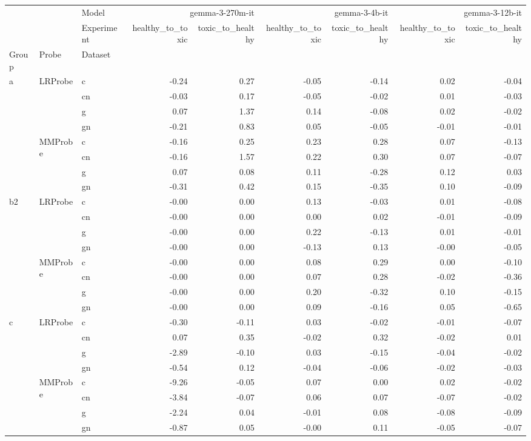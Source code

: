 \begin{tabular}{lllrrrrrr}
\toprule
 &  & Model & \multicolumn{2}{r}{gemma-3-270m-it} & \multicolumn{2}{r}{gemma-3-4b-it} & \multicolumn{2}{r}{gemma-3-12b-it} \\
 &  & Experiment & healthy_to_toxic & toxic_to_healthy & healthy_to_toxic & toxic_to_healthy & healthy_to_toxic & toxic_to_healthy \\
Group & Probe & Dataset &  &  &  &  &  &  \\
\midrule
\multirow[t]{8}{*}{a} & \multirow[t]{4}{*}{LRProbe} & c & -0.24 & 0.27 & -0.05 & -0.14 & 0.02 & -0.04 \\
 &  & cn & -0.03 & 0.17 & -0.05 & -0.02 & 0.01 & -0.03 \\
 &  & g & 0.07 & 1.37 & 0.14 & -0.08 & 0.02 & -0.02 \\
 &  & gn & -0.21 & 0.83 & 0.05 & -0.05 & -0.01 & -0.01 \\
\cline{2-9}
 & \multirow[t]{4}{*}{MMProbe} & c & -0.16 & 0.25 & 0.23 & 0.28 & 0.07 & -0.13 \\
 &  & cn & -0.16 & 1.57 & 0.22 & 0.30 & 0.07 & -0.07 \\
 &  & g & 0.07 & 0.08 & 0.11 & -0.28 & 0.12 & 0.03 \\
 &  & gn & -0.31 & 0.42 & 0.15 & -0.35 & 0.10 & -0.09 \\
\cline{1-9} \cline{2-9}
\multirow[t]{8}{*}{b2} & \multirow[t]{4}{*}{LRProbe} & c & -0.00 & 0.00 & 0.13 & -0.03 & 0.01 & -0.08 \\
 &  & cn & -0.00 & 0.00 & 0.00 & 0.02 & -0.01 & -0.09 \\
 &  & g & -0.00 & 0.00 & 0.22 & -0.13 & 0.01 & -0.01 \\
 &  & gn & -0.00 & 0.00 & -0.13 & 0.13 & -0.00 & -0.05 \\
\cline{2-9}
 & \multirow[t]{4}{*}{MMProbe} & c & -0.00 & 0.00 & 0.08 & 0.29 & 0.00 & -0.10 \\
 &  & cn & -0.00 & 0.00 & 0.07 & 0.28 & -0.02 & -0.36 \\
 &  & g & -0.00 & 0.00 & 0.20 & -0.32 & 0.10 & -0.15 \\
 &  & gn & -0.00 & 0.00 & 0.09 & -0.16 & 0.05 & -0.65 \\
\cline{1-9} \cline{2-9}
\multirow[t]{8}{*}{c} & \multirow[t]{4}{*}{LRProbe} & c & -0.30 & -0.11 & 0.03 & -0.02 & -0.01 & -0.07 \\
 &  & cn & 0.07 & 0.35 & -0.02 & 0.32 & -0.02 & 0.01 \\
 &  & g & -2.89 & -0.10 & 0.03 & -0.15 & -0.04 & -0.02 \\
 &  & gn & -0.54 & 0.12 & -0.04 & -0.06 & -0.02 & -0.03 \\
\cline{2-9}
 & \multirow[t]{4}{*}{MMProbe} & c & -9.26 & -0.05 & 0.07 & 0.00 & 0.02 & -0.02 \\
 &  & cn & -3.84 & -0.07 & 0.06 & 0.07 & -0.07 & -0.02 \\
 &  & g & -2.24 & 0.04 & -0.01 & 0.08 & -0.08 & -0.09 \\
 &  & gn & -0.87 & 0.05 & -0.00 & 0.11 & -0.05 & -0.07 \\
\cline{1-9} \cline{2-9}
\bottomrule
\end{tabular}
